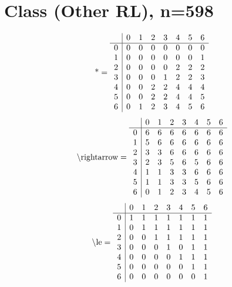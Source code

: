 \documentclass[11pt]{article}
\begin{document}
\section{Class (Other RL), n=598}
\[\text{*} = 
\begin{array}{r | r r r r r r r}
 & 0 & 1 & 2 & 3 & 4 & 5 & 6 \\ \hline
0 & 0 & 0 & 0 & 0 & 0 & 0 & 0 \\
1 & 0 & 0 & 0 & 0 & 0 & 0 & 1 \\
2 & 0 & 0 & 0 & 0 & 2 & 2 & 2 \\
3 & 0 & 0 & 0 & 1 & 2 & 2 & 3 \\
4 & 0 & 0 & 2 & 2 & 4 & 4 & 4 \\
5 & 0 & 0 & 2 & 2 & 4 & 4 & 5 \\
6 & 0 & 1 & 2 & 3 & 4 & 5 & 6 \\
\end{array}
\]
\[\text{\textbackslash rightarrow} = 
\begin{array}{r | r r r r r r r}
 & 0 & 1 & 2 & 3 & 4 & 5 & 6 \\ \hline
0 & 6 & 6 & 6 & 6 & 6 & 6 & 6 \\
1 & 5 & 6 & 6 & 6 & 6 & 6 & 6 \\
2 & 3 & 3 & 6 & 6 & 6 & 6 & 6 \\
3 & 2 & 3 & 5 & 6 & 5 & 6 & 6 \\
4 & 1 & 1 & 3 & 3 & 6 & 6 & 6 \\
5 & 1 & 1 & 3 & 3 & 5 & 6 & 6 \\
6 & 0 & 1 & 2 & 3 & 4 & 5 & 6 \\
\end{array}
\]
\[\text{\textbackslash le} = 
\begin{array}{r | r r r r r r r}
 & 0 & 1 & 2 & 3 & 4 & 5 & 6 \\ \hline
0 & 1 & 1 & 1 & 1 & 1 & 1 & 1 \\
1 & 0 & 1 & 1 & 1 & 1 & 1 & 1 \\
2 & 0 & 0 & 1 & 1 & 1 & 1 & 1 \\
3 & 0 & 0 & 0 & 1 & 0 & 1 & 1 \\
4 & 0 & 0 & 0 & 0 & 1 & 1 & 1 \\
5 & 0 & 0 & 0 & 0 & 0 & 1 & 1 \\
6 & 0 & 0 & 0 & 0 & 0 & 0 & 1 \\
\end{array}
\]
\end{document}
